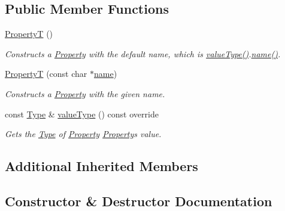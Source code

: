 \subsection*{Public Member Functions}
\begin{DoxyCompactItemize}
\item 
\hyperlink{structdg_1_1deepcore_1_1_property_t_a120c29a057794f782b261d963b4dc671}{PropertyT} ()
\begin{DoxyCompactList}\small\item\em Constructs a \hyperlink{classdg_1_1deepcore_1_1_property}{Property} with the default name, which is \hyperlink{structdg_1_1deepcore_1_1_property_t_a58e459741375097dc9551206b8f7ca32}{value\+Type()}.\hyperlink{classdg_1_1deepcore_1_1_named_object_ab1379a28467dd39a81ceb02cf50dedde}{name()}. \end{DoxyCompactList}\item 
\hyperlink{structdg_1_1deepcore_1_1_property_t_a344ae039c8cf8a81b2596509e6168ed1}{PropertyT} (const char $\ast$\hyperlink{classdg_1_1deepcore_1_1_named_object_ab1379a28467dd39a81ceb02cf50dedde}{name})
\begin{DoxyCompactList}\small\item\em Constructs a \hyperlink{classdg_1_1deepcore_1_1_property}{Property} with the given name. \end{DoxyCompactList}\item 
const \hyperlink{classdg_1_1deepcore_1_1_type}{Type} \& \hyperlink{structdg_1_1deepcore_1_1_property_t_a58e459741375097dc9551206b8f7ca32}{value\+Type} () const override
\begin{DoxyCompactList}\small\item\em Gets the \hyperlink{classdg_1_1deepcore_1_1_type}{Type} of \hyperlink{classdg_1_1deepcore_1_1_property}{Property} \hyperlink{classdg_1_1deepcore_1_1_property}{Property}\textquotesingle{}s value. \end{DoxyCompactList}\end{DoxyCompactItemize}
\subsection*{Additional Inherited Members}


\subsection{Constructor \& Destructor Documentation}

